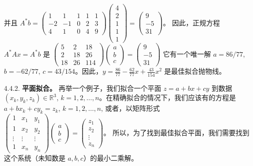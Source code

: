 并且 $A^*b = \begin{pmatrix} 1 & 1 & 1 & 1 & 1 \\ -2 & -1 & 0 & 2 & 3 \\ 4 & 1 & 0 & 4 & 9 \end{pmatrix} \begin{pmatrix} 4 \\ 2 \\ 1 \\ 1 \\ 1 \end{pmatrix} = \begin{pmatrix} 9 \\ -5 \\ 31 \end{pmatrix}$。
因此，正规方程 $A^*Ax = A^*b$ 是
$\begin{pmatrix} 5 & 2 & 18 \\ 2 & 18 & 26 \\ 18 & 26 & 114 \end{pmatrix} \begin{pmatrix} a \\ b \\ c \end{pmatrix} = \begin{pmatrix} 9 \\ -5 \\ 31 \end{pmatrix}$
它有一个唯一解 $a = 86/77$, $b = -62/77$, $c = 43/154$。因此，$y = \frac{86}{77} - \frac{62}{77}x + \frac{43}{154}x^2$ 是最佳拟合抛物线。

4.4.2. \textbf{平面拟合。} 再举一个例子，我们拟合一个平面 $z = a + bx + cy$ 到数据 $(x_k, y_k, z_k) \in \mathbb{R}^3$, $k=1, 2, \dots, n$。在精确拟合的情况下，我们应该有的方程是
$a + bx_k + cy_k = z_k$, $k=1, 2, \dots, n$,
或者，以矩阵形式
$\begin{pmatrix} 1 & x_1 & y_1 \\ 1 & x_2 & y_2 \\ \vdots & \vdots & \vdots \\ 1 & x_n & y_n \end{pmatrix} \begin{pmatrix} a \\ b \\ c \end{pmatrix} = \begin{pmatrix} z_1 \\ z_2 \\ \vdots \\ z_n \end{pmatrix}$。
所以，为了找到最佳拟合平面，我们需要找到这个系统（未知数是 $a, b, c$）的最小二乘解。


